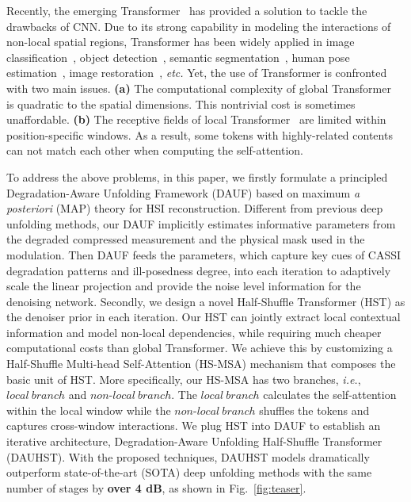 \documentclass{article}
\begin{document}
Recently, the emerging Transformer~\cite{vaswani2017attention} has provided a solution to tackle the drawbacks of CNN. Due to its strong capability in modeling the interactions of non-local spatial regions, Transformer has been widely applied in image classification~\cite{liu2021swin,arnab2021vivit,global_msa,tc_2,tc_3,xcit,crossvit}, object detection~\cite{de_detr,to_1,liu2021swin,DETR,dy_detr,to_2,to_5}, semantic segmentation~\cite{liu2021swin,tc_3,ts_1,cao2021swin,ts_2,ts_3,ts_4}, human pose estimation~\cite{tokenpose,transpose,rsn,prtr,th_1,th_2,th_3}, image restoration~\cite{ipt,swinir,uformer,vsrt,fgst,mst,mst_pp,cst,pngan,rformer}, \emph{etc.} Yet, the use of Transformer is confronted with two main issues. \textbf{(a)} The computational complexity of global Transformer~\cite{global_msa} is quadratic to the spatial dimensions. This nontrivial cost is sometimes unaffordable. \textbf{(b)} The receptive fields of local Transformer~\cite{liu2021swin} are limited within position-specific windows. As a result, some tokens with highly-related contents can not match each other when computing the self-attention.  

To address the above problems, in this paper, we firstly formulate a principled Degradation-Aware Unfolding Framework (DAUF) based on maximum \emph{a posteriori} (MAP) theory for HSI reconstruction. Different from previous deep unfolding methods, our DAUF implicitly estimates informative parameters from the degraded compressed measurement and the physical mask used in the modulation. Then DAUF feeds the parameters, which capture key cues of CASSI degradation patterns and ill-posedness  degree, into each iteration to adaptively scale the linear projection and provide the noise level information for the denoising network. Secondly, we design a novel Half-Shuffle Transformer (HST) as the denoiser prior in each iteration. Our HST can jointly extract local contextual information and model non-local dependencies, while requiring much cheaper computational costs than global Transformer. We achieve this by customizing a Half-Shuffle Multi-head Self-Attention (HS-MSA) mechanism that composes the basic unit of HST. More specifically, our HS-MSA has two branches, \emph{i.e.}, $local~branch$ and $non$-$local~branch$. The $local~branch$ calculates the self-attention within the local window while the $non$-$local~branch$ shuffles the tokens and captures cross-window interactions. We plug HST into DAUF to establish an  iterative architecture, Degradation-Aware Unfolding Half-Shuffle Transformer (DAUHST). With the proposed  techniques, DAUHST models dramatically outperform state-of-the-art (SOTA) deep unfolding methods  with the same number of stages by \textbf{over 4 dB}, as shown in Fig.~\ref{fig:teaser}.
\end{document}
